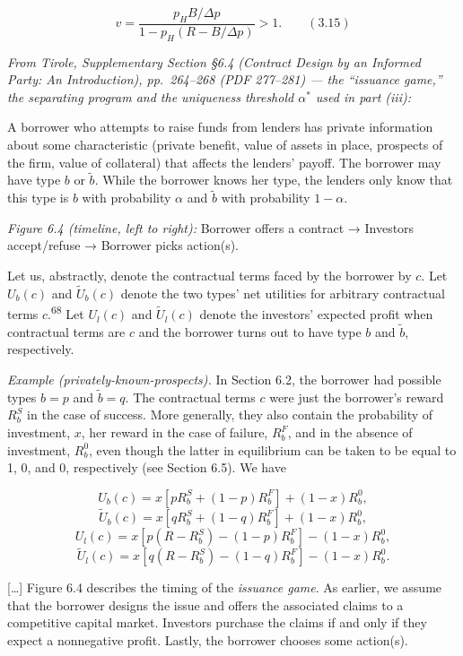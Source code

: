 \documentclass[11pt,a4paper]{article}
\begin{document}
\[v = \frac{p_H B/\Delta p}{1 - p_H(R - B/\Delta p)} > 1. \qquad (3.15)\]

\emph{From Tirole, Supplementary Section §6.4 (Contract Design by an Informed Party: An
Introduction), pp.~264--268 (PDF 277--281) --- the ``issuance game,'' the separating program and the
uniqueness threshold \(\alpha^*\) used in part (iii):}

A borrower who attempts to raise funds from lenders has private information about some
characteristic (private benefit, value of assets in place, prospects of the firm, value of
collateral) that affects the lenders' payoff. The borrower may have type \(b\) or \(\tilde{b}\).
While the borrower knows her type, the lenders only know that this type is \(b\) with probability
\(\alpha\) and \(\tilde{b}\) with probability \(1 - \alpha\).

\emph{Figure 6.4 (timeline, left to right):} Borrower offers a contract → Investors accept/refuse →
Borrower picks action(s).

Let us, abstractly, denote the contractual terms faced by the borrower by \(c\). Let \(U_b(c)\) and
\(\tilde{U}_b(c)\) denote the two types' net utilities for arbitrary contractual terms
\(c\).\textsuperscript{68} Let \(U_l(c)\) and \(\tilde{U}_l(c)\) denote the investors' expected
profit when contractual terms are \(c\) and the borrower turns out to have type \(b\) and
\(\tilde{b}\), respectively.

\emph{Example (privately-known-prospects).} In Section 6.2, the borrower had possible types
\(b = p\) and \(\tilde{b} = q\). The contractual terms \(c\) were just the borrower's reward
\(R_b^S\) in the case of success. More generally, they also contain the probability of investment,
\(x\), her reward in the case of failure, \(R_b^F\), and in the absence of investment, \(R_b^0\),
even though the latter in equilibrium can be taken to be equal to 1, 0, and 0, respectively (see
Section 6.5). We have

\[U_b(c) = x[pR_b^S + (1 - p)R_b^F] + (1 - x)R_b^0,\]
\[\tilde{U}_b(c) = x[qR_b^S + (1 - q)R_b^F] + (1 - x)R_b^0,\]
\[U_l(c) = x[p(R - R_b^S) - (1 - p)R_b^F] - (1 - x)R_b^0,\]
\[\tilde{U}_l(c) = x[q(R - R_b^S) - (1 - q)R_b^F] - (1 - x)R_b^0.\]

{[}\ldots{]} Figure 6.4 describes the timing of the \emph{issuance game}. As earlier, we assume that
the borrower designs the issue and offers the associated claims to a competitive capital market.
Investors purchase the claims if and only if they expect a nonnegative profit. Lastly, the borrower
chooses some action(s).
\end{document}
